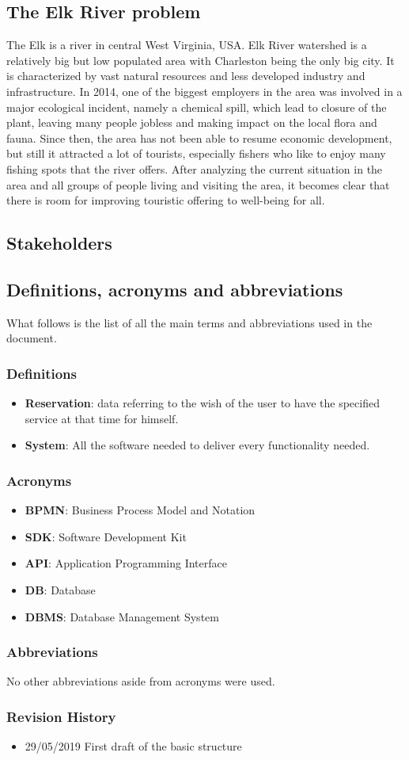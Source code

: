 \subsection{The Elk River problem}
The Elk is a river in central West Virginia, USA. Elk River watershed is a relatively big but low populated area with Charleston being the only big city. It is characterized by vast natural resources and less developed industry and infrastructure. In 2014, one of the biggest employers in the area was involved in a major ecological incident, namely a chemical spill, which lead to closure of the plant, leaving many people jobless and making impact on the local flora and fauna. Since then, the area has not been able to resume economic development, but still it attracted a lot of tourists, especially fishers who like to enjoy many fishing spots that the river offers. After analyzing the current situation in the area and all groups of people living and visiting the area, it becomes clear that there is room for improving touristic offering to well-being for all.
\subsection{Stakeholders}

\subsection{Definitions, acronyms and abbreviations}
What follows is the list of all the main terms and abbreviations used in the document.
\subsubsection{Definitions}
\begin{itemize}
\item \textbf{Reservation}: data referring to the wish of the user to have the specified service at that time for himself.
\item \textbf{System}: All the software needed to deliver every functionality needed.
\end{itemize}
\subsubsection{Acronyms}
\begin{itemize}
\item \textbf{BPMN}: Business Process Model and Notation
\item \textbf{SDK}: Software Development Kit
\item \textbf{API}: Application Programming Interface
\item \textbf{DB}: Database
\item \textbf{DBMS}: Database Management System
\end{itemize}
\subsubsection{Abbreviations}
No other abbreviations aside from acronyms were used.
\subsubsection{Revision History}
\begin{itemize}
\item 29/05/2019 First draft of the basic structure
\end{itemize}